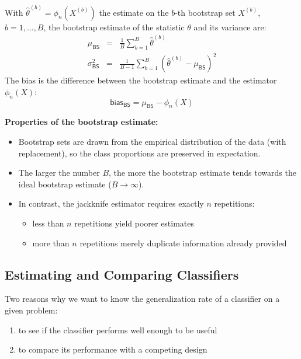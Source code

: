   With $\hat\theta^{(b)}=\phi_n(X^{(b)})$ the estimate on the $b$-th bootstrap set $X^{(b)}$, $b=1,\dots,B$, the bootstrap estimate of the statistic $\theta$ and its variance are:
  \begin{eqnarray*}
    \mu_{\mathsf{BS}}      &=& \frac{1}{B} \sum_{b=1}^B \hat{\theta}^{(b)} \\
    \sigma^2_{\mathsf{BS}} &=& \frac{1}{B-1} \sum_{b=1}^B \left( \hat{\theta}^{(b)} - \mu_{\mathsf{BS}} \right)^2
  \end{eqnarray*}
  The bias is the difference between the bootstrap estimate and the estimator $\phi_n(X)$:
  \begin{displaymath}
    \mathsf{bias}_{\mathsf{BS}} = \mu_{\mathsf{BS}} - \phi_n(X)
  \end{displaymath}
 
 \textbf{Properties of the bootstrap estimate:}
  \begin{itemize}
    \item Bootstrap sets are drawn from the empirical distribution of the data (with replacement), so the class proportions are preserved in expectation.
    \item The larger the number $B$, the more the bootstrap estimate tends towards the ideal bootstrap estimate ($B\to\infty$).
    \item In contrast, the jackknife estimator requires exactly $n$ repetitions: 
      \begin{itemize}
        \item less than $n$ repetitions yield poorer estimates
        \item more than $n$ repetitions merely duplicate information already provided
      \end{itemize}
  \end{itemize}

\subsection{Estimating and Comparing Classifiers}

  Two reasons why we want to know the generalization rate of a classifier on a given problem:

  \begin{enumerate}
    \item to see if the classifier performs well enough to be useful
    \item to compare its performance with a competing design
  \end{enumerate}
